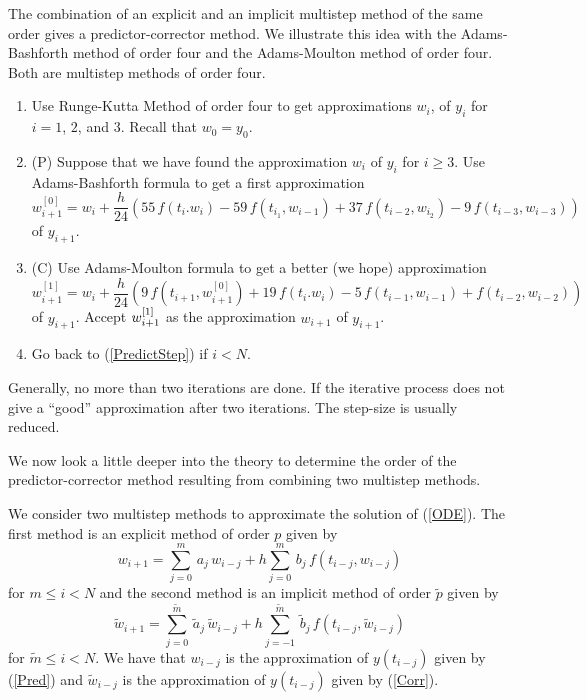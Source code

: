 The combination of an explicit and an implicit multistep method of
the same order gives a predictor-corrector method.  We illustrate this
idea with the Adams-Bashforth method of order four and the
Adams-Moulton method of order four.  Both are multistep methods of
order four.

\begin{algo}
\begin{enumerate}
\item Use Runge-Kutta Method of order four to get approximations $w_i$,
of $y_i$ for $i=1$, $2$, and $3$.  Recall that $w_0 = y_0$.
\item ($\mathrm{P}$) Suppose that we have found the approximation $w_i$ of $y_i$
for $i\geq 3$.  Use Adams-Bashforth formula to get a first approximation
\[
w_{i+1}^{[0]} = w_i + \frac{h}{24} \left( 55 \, f(t_i.w_i) - 59 \,
f(t_{i_1},w_{i-1}) + 37\, f(t_{i-2},w_{i_2}) - 9 \,f(t_{i-3},w_{i-3}) \right)
\]
of $y_{i+1}$. \label{PredictStep}
\item ($\mathrm{C}$) Use Adams-Moulton formula to get a better (we hope)
approximation
\[
w_{i+1}^{[1]} = w_i + \frac{h}{24} \left( 9\, f\left(t_{i+1},w_{i+1}^{[0]}\right)
+ 19 \,f(t_i.w_i)  - 5 \,f(t_{i-1},w_{i-1}) + f(t_{i-2},w_{i-2})\right)
\]
of $y_{i+1}$.  Accept $\displaystyle w_{i+1}^{[1]}$ as the
approximation $w_{i+1}$ of $y_{i+1}$.
\item Go back to (\ref{PredictStep}) if $i<N$.
\end{enumerate}
\end{algo}

\begin{rmk}
Generally, no more than two iterations are done.  If the iterative
process does not give a ``good'' approximation after two
iterations.  The step-size is usually reduced.
\end{rmk}

We now look a little deeper into the theory to determine the order of
the predictor-corrector method resulting from combining two multistep
methods.

We consider two multistep methods to approximate the solution of
(\ref{ODE}).  The first method is an explicit method of order $p$
given by
\begin{equation} \label{Pred}
w_{i+1} = \sum_{j=0}^m\,a_j\,w_{i-j} + h \sum_{j=0}^m\,b_j\,f(t_{i-j},w_{i-j})
\end{equation}
for $m\leq i < N$ and the second method is an implicit method of order
$\tilde{p}$ given by
\begin{equation} \label{Corr}
\tilde{w}_{i+1} = \sum_{j=0}^{\tilde{m}}\,\tilde{a}_j\,\tilde{w}_{i-j}
+ h \sum_{j=-1}^{\tilde{m}}\,\tilde{b}_j\,f(t_{i-j},\tilde{w}_{i-j})
\end{equation}
for $\tilde{m} \leq i < N$.  We have that
$w_{i-j}$ is the approximation of $y(t_{i-j})$ given by
(\ref{Pred}) and $\tilde{w}_{i-j}$ is the approximation of
$y(t_{i-j})$ given by (\ref{Corr}).

